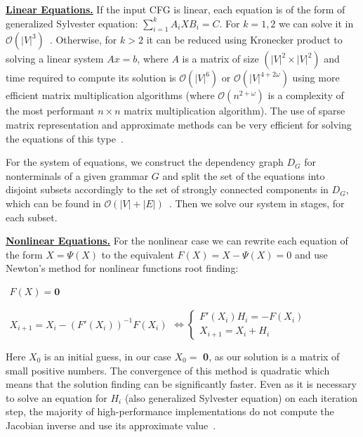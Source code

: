 \documentclass[sigconf]{acmart}
\begin{document}
\underline{\textbf{Linear Equations.}}
If the input CFG is linear, each equation is of the form of generalized Sylvester equation: $\sum_{i = 1}^{k} A_iXB_i = C$.
For $k = 1, 2$ we can solve it in $\mathcal{O}(|V|^3)$~\cite{Bartels:1972:SME:361573.361582}.
Otherwise, for $k > 2$ it can be reduced using Kronecker product to solving a linear system $Ax = b$, where $A$ is a matrix of size $(|V|^2 \times |V|^2)$ and time required to compute its solution is $\mathcal{O}(|V|^6)$ or $\mathcal{O}(|V|^{4 + 2\omega})$ using more efficient matrix multiplication algorithms (where $\mathcal{O}(n^{2+\omega})$ is a complexity of the most performant $n\times n$ matrix multiplication algorithm).
The use of sparse matrix representation and approximate methods can be very efficient for solving the equations of this type~\cite{bouhamidi2008}.

For the system of equations, we construct the dependency graph $D_G$ for nonterminals of a given grammar $G$ and split the set of the equations into disjoint subsets accordingly to the set of strongly connected components in $D_G$, which can be found in $\mathcal{O}(|V| + |E|)$~\cite{tarjan1972}.
Then we solve our system in stages, for each subset.

\underline{\textbf{Nonlinear Equations.}}
For the nonlinear case we can rewrite each equation of the form $X = \Psi(X)$ to the equivalent $F(X) = X - \Psi(X) = 0$ and use Newton's method for nonlinear functions root finding:

\begin{center}
\(
\left.
\begin{array}{c}
F(X) = \mathbf{0}
\end{array}
\right.
\)

\(
\left.
\begin{array}{l}
X_{i+1} = X_i - (F'(X_i))^{-1}F(X_i)
\end{array}
\right.
\iff
\left\{
\begin{array}{l}
F'(X_i)H_i = - F(X_i) \\
X_{i+1} = X_i + H_i
\end{array}
\right.
\)
\end{center}

Here $X_0$ is an initial guess, in our case $X_0 = $ \textbf{0}, as our solution is a matrix of small positive numbers.
The convergence of this method is quadratic which means that the solution finding can be significantly faster.
Even as it is necessary to solve an equation for $H_i$ (also generalized Sylvester equation) on each iteration step, the majority of high-performance implementations do not compute the Jacobian inverse and use its approximate value~\cite{knoll2004jacobian}.
\end{document}
